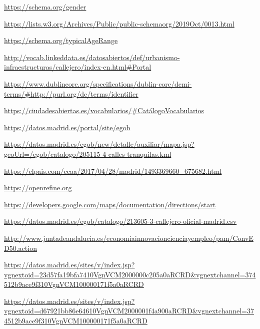 \begin{thebibliography}{99}
\url{https://schema.org/gender}

\url{https://lists.w3.org/Archives/Public/public-schemaorg/2019Oct/0013.html}

\url{https://schema.org/typicalAgeRange}


\url{http://vocab.linkeddata.es/datosabiertos/def/urbanismo-infraestructuras/callejero/index-en.html#Portal}


\url{https://www.dublincore.org/specifications/dublin-core/dcmi-terms/#http://purl.org/dc/terms/identifier}


\url{https://ciudadesabiertas.es/vocabularios/#CatálogoVocabularios}


\url{https://datos.madrid.es/portal/site/egob}

\url{https://datos.madrid.es/egob/new/detalle/auxiliar/mapa.jsp?geoUrl=/egob/catalogo/205115-4-calles-tranquilas.kml}

\url{https://elpais.com/ccaa/2017/04/28/madrid/1493369660_675682.html}


\url{https://openrefine.org}

\url{https://developers.google.com/maps/documentation/directions/start}

\url{https://datos.madrid.es/egob/catalogo/213605-3-callejero-oficial-madrid.csv}

\url{http://www.juntadeandalucia.es/economiainnovacioncienciayempleo/pam/ConvED50.action}

\url{https://datos.madrid.es/sites/v/index.jsp?vgnextoid=23d57fa19bfa7410VgnVCM2000000c205a0aRCRD&vgnextchannel=374512b9ace9f310VgnVCM100000171f5a0aRCRD}

\url{https://datos.madrid.es/sites/v/index.jsp?vgnextoid=d67921bb86e64610VgnVCM2000001f4a900aRCRD&vgnextchannel=374512b9ace9f310VgnVCM100000171f5a0aRCRD}

\end{thebibliography}
